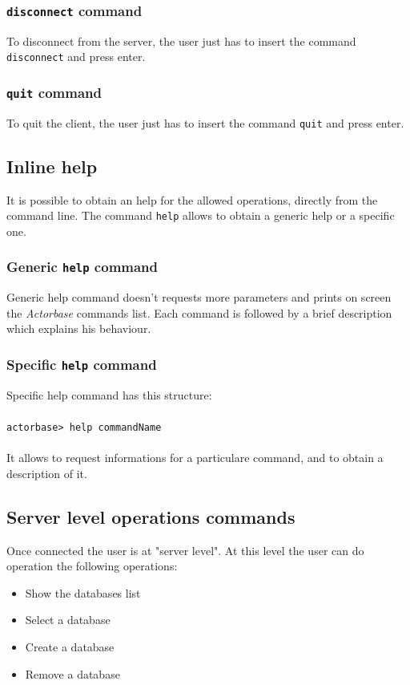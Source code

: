 \documentclass[a4paper]{article}
\begin{document}
	\subsubsection{\texttt{disconnect} command}
	To disconnect from the server, the user just has to insert the command \texttt{disconnect} and press enter.
	
	\subsubsection{\texttt{quit} command}
	To quit the client, the user just has to insert the command \texttt{quit} and press enter.

	\subsection{Inline help}
	It is possible to obtain an help for the allowed operations, directly from the command line. The command \texttt{help} allows to obtain a generic help or a specific one.
	
	\subsubsection{Generic \texttt{help} command}
	Generic help command doesn't requests more parameters and prints on screen the \emph{Actorbase} commands list. Each command is followed by a brief description which explains his behaviour.
	
	\subsubsection{Specific \texttt{help} command}
	Specific help command has this structure:
	\\ \\
	\texttt{actorbase>	help commandName}
	\\ \\
	It allows to request informations for a particulare command, and to obtain a description of it.
	
	\subsection{Server level operations commands}
	Once connected the user is at "server level". At this level the user can do operation the following operations:
	\begin{itemize}
		\item Show the databases list
		\item Select a database
		\item Create a database
		\item Remove a database
	\end{itemize}
	
\end{document}
